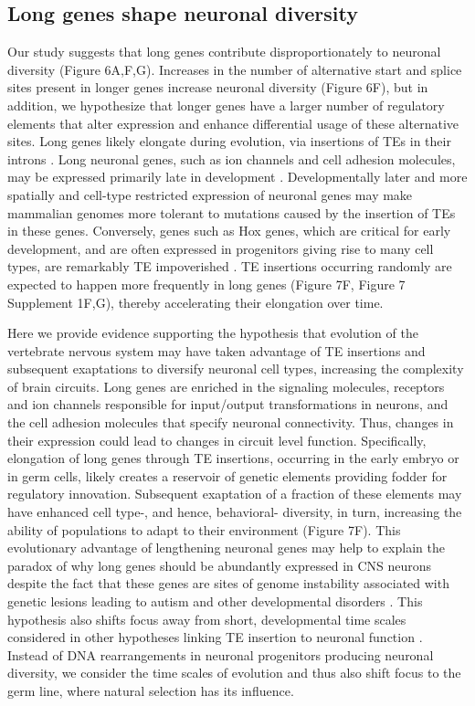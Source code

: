 \subsection{Long genes shape neuronal diversity}
Our study suggests that long genes contribute disproportionately to neuronal diversity (Figure 6A,F,G). Increases in the number of alternative start and splice sites present in longer genes increase neuronal diversity (Figure 6F), but in addition, we hypothesize that longer genes have a larger number of regulatory elements that alter expression and enhance differential usage of these alternative sites. Long genes likely elongate during evolution, via insertions of TEs in their introns \citep[Figure 7A,B;][]{Sela_2007,Grishkevich_2014}. Long neuronal genes, such as ion channels and cell adhesion molecules, may be expressed primarily late in development \citep{Okaty_2009}. Developmentally later and more spatially and cell-type restricted expression of neuronal genes may make mammalian genomes more tolerant to mutations caused by the insertion of TEs in these genes. Conversely, genes such as Hox genes, which are critical for early development, and are often expressed in progenitors giving rise to many cell types, are remarkably TE impoverished \citep{Chinwalla_2002,Simons_2005}. TE insertions occurring randomly are expected to happen more frequently in long genes (Figure 7F, Figure 7 Supplement 1F,G), thereby accelerating their elongation over time. %

Here we provide evidence supporting the hypothesis that evolution of the vertebrate nervous system may have taken advantage of TE insertions and subsequent exaptations to diversify neuronal cell types, increasing the complexity of brain circuits. Long genes are enriched in the signaling molecules, receptors and ion channels responsible for input/output transformations in neurons, and the cell adhesion molecules that specify neuronal connectivity. Thus, changes in their expression could lead to changes in circuit level function. Specifically, elongation of long genes through TE insertions, occurring in the early embryo or in germ cells, likely creates a reservoir of genetic elements providing fodder for regulatory innovation. Subsequent exaptation of a fraction of these elements may have enhanced cell type-, and hence, behavioral- diversity, in turn, increasing the ability of populations to adapt to their environment (Figure 7F). This evolutionary advantage of lengthening neuronal genes may help to explain the paradox of why long genes should be abundantly expressed in CNS neurons despite the fact that these genes are sites of genome instability associated with genetic lesions leading to autism and other developmental disorders \citep{Wei_2016}. This hypothesis also shifts focus away from short, developmental time scales considered in other hypotheses linking TE insertion to neuronal function \citep{Muotri_2005,Richardson_2014,Perrat_2013}. Instead of DNA rearrangements in neuronal progenitors producing neuronal diversity, we consider the time scales of evolution and thus also shift focus to the germ line, where natural selection has its influence. 

